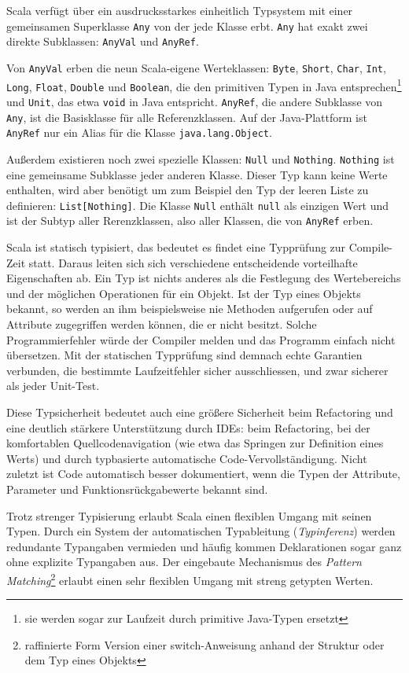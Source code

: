 \documentclass[a4paper, 12pt, listof=totoc, bibliography=totoc]{scrreprt}
\begin{document}
Scala verfügt über ein ausdrucksstarkes einheitlich Typsystem mit einer gemeinsamen Superklasse \texttt{Any} von der jede Klasse erbt. \texttt{Any} hat exakt zwei direkte Subklassen: \texttt{AnyVal} und \texttt{AnyRef}. 

Von \texttt{AnyVal} erben die neun Scala-eigene Werteklassen: \texttt{Byte}, \texttt{Short}, \texttt{Char}, \texttt{Int}, \texttt{Long}, \texttt{Float}, \texttt{Double} und \texttt{Boolean}, die den primitiven Typen in Java entsprechen\footnote{
	sie werden sogar zur Laufzeit durch primitive Java-Typen ersetzt}
und \texttt{Unit}, das etwa \texttt{void} in Java entspricht. \texttt{AnyRef}, die andere Subklasse von \texttt{Any}, ist die Basisklasse für alle Referenzklassen. Auf der Java-Plattform ist \texttt{AnyRef} nur ein Alias für die Klasse \texttt{java.lang.Object}. 

Außerdem existieren noch zwei spezielle Klassen: \texttt{Null} und \texttt{Nothing}. \texttt{Nothing} ist eine gemeinsame Subklasse jeder anderen Klasse. Dieser Typ kann keine Werte enthalten, wird aber benötigt um zum Beispiel den Typ der leeren Liste zu definieren: \texttt{List[Nothing]}. Die Klasse \texttt{Null} enthält \texttt{null} als einzigen Wert und ist der Subtyp aller Rerenzklassen, also aller Klassen, die von \texttt{AnyRef} erben.

Scala ist statisch typisiert, das bedeutet es findet eine Typprüfung zur Compile-Zeit statt. Daraus leiten sich sich verschiedene entscheidende vorteilhafte Eigenschaften ab. Ein Typ ist nichts anderes als die Festlegung des Wertebereichs und der möglichen Operationen für ein Objekt. Ist der Typ eines Objekts bekannt, so werden an ihm beispielsweise nie Methoden aufgerufen oder auf Attribute zugegriffen werden können, die er nicht besitzt. Solche Programmierfehler würde der Compiler melden und das Programm einfach nicht übersetzen. Mit der statischen Typprüfung sind demnach echte Garantien verbunden, die bestimmte Laufzeitfehler sicher ausschliessen, und zwar sicherer als jeder Unit-Test.

Diese Typsicherheit bedeutet auch eine größere Sicherheit beim Refactoring und eine deutlich stärkere Unterstützung durch IDEs: beim Refactoring, bei der komfortablen Quellcodenavigation (wie etwa das Springen zur Definition eines Werts) und durch typbasierte automatische Code-Vervollständigung. Nicht zuletzt ist Code automatisch besser dokumentiert, wenn die Typen der Attribute, Parameter und Funktionsrückgabewerte bekannt sind.

Trotz strenger Typisierung erlaubt Scala einen flexiblen Umgang mit seinen Typen. Durch ein System der automatischen Typableitung (\textit{Typinferenz}) werden redundante Typangaben vermieden und häufig kommen Deklarationen sogar ganz ohne explizite Typangaben aus. Der eingebaute Mechanismus des \textit{Pattern Matching}\footnote{
	raffinierte Form Version einer switch-Anweisung anhand der Struktur oder dem Typ eines Objekts}
erlaubt einen sehr flexiblen Umgang mit streng getypten Werten.
\end{document}
